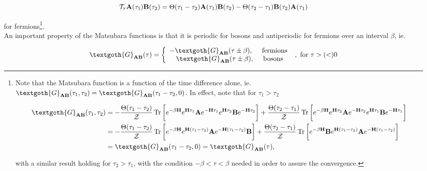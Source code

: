 $$
    {\mathcal {T}}_{\tau} {\bf A}(\tau_1) {\bf B}(\tau_2) = \Theta(\tau_1 - \tau_2) {\bf A}(\tau_1) {\bf B}(\tau_2) - \Theta(\tau_2 - \tau_1) {\bf B}(\tau_2) {\bf A}(\tau_1) 
$$

for fermions\footnote{Note that the Matsubara function is a function of the time difference alone, ie. $\textgoth{G}_{{\bf A} {\bf B}}(\tau_1, \tau_2) = \textgoth{G}_{{\bf A} {\bf B}}(\tau_1-\tau_2,0)$. In effect, note that for $\tau_1 > \tau_2$

\begin{equation*}
    \begin{split}
        \textgoth{G}_{{\bf A} {\bf B}}(\tau_1, \tau_2) &= - \frac{\Theta(\tau_1-\tau_2)}{\mathcal{Z}} \Tr \bigg[
           e^{-\beta {\bf H}} e^{{\bf H} \tau_1} {\bf A} e^{-{\bf H}\tau_1} e^{{\bf H}\tau_2} {\bf B} e^{-{\bf H}\tau_2} 
        \bigg] + \frac{\Theta(\tau_2-\tau_1)}{\mathcal{Z}} \Tr \bigg[
           e^{-\beta {\bf H}} e^{{\bf H} \tau_2} {\bf A} e^{-{\bf H}\tau_2} e^{{\bf H}\tau_1} {\bf B} e^{-{\bf H}\tau_1} 
        \bigg] \\
        &= - \frac{\Theta(\tau_1-\tau_2)}{\mathcal{Z}} \Tr \bigg[
           e^{-\beta {\bf H}} e^{{\bf H} (\tau_1 - \tau_2)} {\bf A} e^{-{\bf H}(\tau_1-\tau_2)} {\bf B}  
        \bigg] + \frac{\Theta(\tau_2-\tau_1)}{\mathcal{Z}} \Tr \bigg[
           e^{-\beta {\bf H}}  {\bf B} e^{{\bf H} (\tau_1 - \tau_2)} {\bf A} e^{-{\bf H}(\tau_1 -\tau_2)}
        \bigg] \\
        &= \textgoth{G}_{{\bf A} {\bf B}}(\tau_1-\tau_2, 0) = \textgoth{G}_{{\bf A} {\bf B}}(\tau),
    \end{split}
\end{equation*}

with a similar result holding for $\tau_2 > \tau_1$, with the condition $-\beta < \tau < \beta$ needed in order to assure the convergence.
}. \\

An important property of the Matsubara functions is that it is periodic for bosons and antiperiodic for fermions over an interval $\beta$, ie. 

\begin{equation}
    \textgoth{G}_{{\bf A} {\bf B}}(\tau) = 
    \left\{\begin{array}{cc}
         -\textgoth{G}_{{\bf A} {\bf B}}(\tau \pm \beta), \quad \textnormal{ fermions } \\
         \textgoth{G}_{{\bf A} {\bf B}}(\tau \pm \beta), \quad \textnormal{ bosons}
    \end{array} \right., \textnormal{ for $\tau >(<)0$}
\end{equation}

